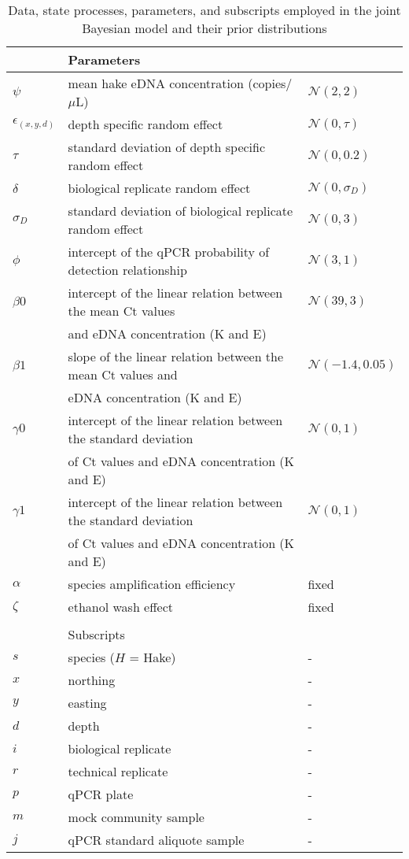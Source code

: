 \documentclass{article}
\begin{document}
\begin{table}[h]
\begin{tabular}{lll}
&Parameters&\\
\hline
$\psi$& mean hake eDNA concentration (copies/$\mu$L) & $\mathcal{N}(2,2)$\\
$\epsilon_{(x,y,d)}$& depth specific random effect & $\mathcal{N}(0,\tau)$\\
$\tau$& standard deviation of depth specific random effect & $\mathcal{N}(0,0.2)$\\
$\delta$& biological replicate random effect & $\mathcal{N}(0,\sigma_D)$\\
$\sigma_D$& standard deviation of biological replicate random effect  & $\mathcal{N}(0,3)$\\
$\phi$& intercept of the qPCR probability of detection relationship & $\mathcal{N}(3,1)$\\
$\beta0$& intercept of the linear relation between the mean Ct values&$\mathcal{N}(39,3)$\\
&and eDNA concentration (K and E) & \\
$\beta1$& slope of the linear relation between the mean Ct values and &$\mathcal{N}(-1.4,0.05)$\\
&eDNA concentration (K and E) & \\
$\gamma0$& intercept of the linear relation between the standard deviation&$\mathcal{N}(0,1)$\\
&of Ct values and eDNA concentration (K and E) & \\
$\gamma1$& intercept of the linear relation between the standard deviation &$\mathcal{N}(0,1)$\\
&of Ct values and eDNA concentration (K and E) & \\
$\alpha$& species amplification efficiency & fixed\\
$\zeta$& ethanol wash effect & fixed\\
&&\\
&Subscripts&\\
\hline
$s$& species ($H$ = Hake) & -\\
$x$& northing & -\\
$y$& easting & -\\
$d$& depth & -\\
$i$& biological replicate & -\\
$r$& technical replicate & -\\
$p$& qPCR plate & -\\
$m$& mock community sample & -\\
$j$& qPCR standard aliquote sample & -\\


    \end{tabular}
    \caption{Data, state processes, parameters, and subscripts employed in the joint Bayesian model and their prior distributions}
    \label{tab:filter_error}
\end{table}
\end{document}
